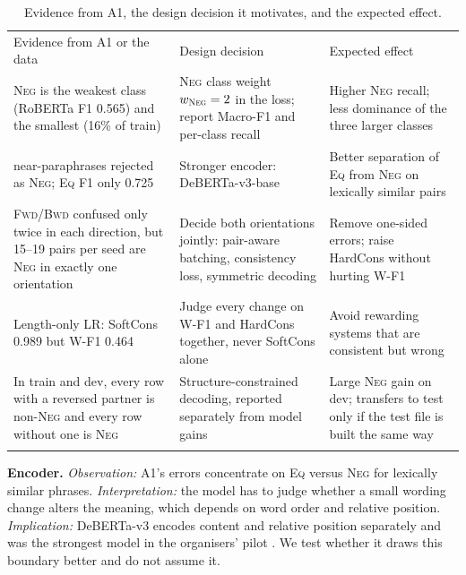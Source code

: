 \documentclass[10pt,a4paper,twocolumn]{article}
\newcommand{\Eq}{\textsc{Eq}}
\newcommand{\Fwd}{\textsc{Fwd}}
\newcommand{\Bwd}{\textsc{Bwd}}
\newcommand{\Neg}{\textsc{Neg}}
\begin{document}
\begin{table}[!t]
\centering
\footnotesize
\begin{tabularx}{\textwidth}{>{\raggedright\arraybackslash}p{4.6cm} >{\raggedright\arraybackslash}p{4.4cm} Y}
\toprule
Evidence from A1 or the data & Design decision & Expected effect \\\addlinespace[3pt]
\midrule\addlinespace[1pt]
\Neg{} is the weakest class (RoBERTa F1 0.565) and the smallest (16\% of train) & \Neg{} class weight $w_{\Neg}=2$ in the loss; report Macro-F1 and per-class recall & Higher \Neg{} recall; less dominance of the three larger classes \\ near-paraphrases rejected as \Neg; \Eq{} F1 only 0.725 & Stronger encoder: DeBERTa-v3-base \citep{he2023debertav3} & Better separation of \Eq{} from \Neg{} on lexically similar pairs \\\addlinespace[3pt]
\Fwd/\Bwd{} confused only twice in each direction, but 15--19 pairs per seed are \Neg{} in exactly one orientation & Decide both orientations jointly: pair-aware batching, consistency loss, symmetric decoding & Remove one-sided errors; raise HardCons without hurting W-F1 \\\addlinespace[3pt]
Length-only LR: SoftCons 0.989 but W-F1 0.464 & Judge every change on W-F1 and HardCons together, never SoftCons alone & Avoid rewarding systems that are consistent but wrong \\\addlinespace[3pt]
In train and dev, every row with a reversed partner is non-\Neg{} and every row without one is \Neg & Structure-constrained decoding, reported separately from model gains & Large \Neg{} gain on dev; transfers to test only if the test file is built the same way \\\addlinespace[3pt]
\bottomrule
\end{tabularx}
\caption{Evidence from A1, the design decision it motivates, and the expected effect.}
\label{tab:just}
\end{table}

\textbf{Encoder.} \emph{Observation:} A1's errors concentrate on \Eq{} versus \Neg{} for lexically similar phrases. \emph{Interpretation:} the model has to judge whether a small wording change alters the meaning, which depends on word order and relative position. \emph{Implication:} DeBERTa-v3 encodes content and relative position separately and was the strongest model in the organisers' pilot \citep{he2023debertav3,apaolaza2026assessing}. We test whether it draws this boundary better and do not assume it.
\end{document}
